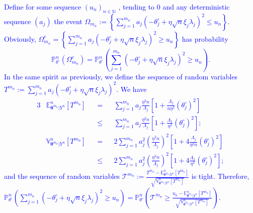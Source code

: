 \textcolor{blue}{
Define for some sequence $(u_{n})_{n \in \mathds{N}}$ , tending to $0$ and any deterministic sequence $(a_{j})$ the event $\Omega_{m_{n}} := \left\{\sum\limits_{j=1}^{m_{n}}a_{j}\left(- \theta^{\circ}_{j} + \eta \sqrt{n} \xi_{j} \lambda_{j}\right)^{2} \leq u_{n}\right\}.$\\
Obviously, $\Omega_{m_{n}}^{c} = \left\{\sum\limits_{j=1}^{m_{n}} a_{j} \left( - \theta^{\circ}_{j} + \eta \sqrt{n} \xi_{j} \lambda_{j}\right)^{2} \geq u_{n}\right\}$ has probability
\[\mathds{P}_{\theta^{\circ}}^{n}\left(\Omega_{m_{n}}^{c}\right) = \mathds{P}_{\theta^{\circ}}^{n}\left(\sum\limits_{j=1}^{m_{n}}\left(- \theta^{\circ}_{j} + \eta \sqrt{n} \xi_{j} \lambda_{j}\right)^{2} \geq u_{n}\right).\]
In the same spirit as previously, we define the sequence of random variables $T^{m_{n}} := \sum\limits_{j=1}^{m_{n}}a_{j}\left(- \theta^{\circ}_{j} + \eta \sqrt{n} \xi_{j} \lambda_{j}\right)^{2}.$
We have
\begin{alignat*}{3}
&\mathds{E}_{\boldsymbol{\theta}^{m_{n}} \vert Y^{n}}^{n}\left[T^{m_{n}}\right] &&=&& \sum\limits_{j = 1}^{m_{n}} a_{j} \frac{\eta^{2} n}{\Lambda_{j}} \left[1 + \frac{\Lambda_{j}}{n \eta^{2}} \left(\theta^{\circ}_{j} \right)^{2}\right]\\
& &&\leq&& \sum\limits_{j = 1}^{m_{n}} a_{j} \frac{\eta^{2} n}{\Lambda_{j}} \left[1 + \frac{\Lambda_{1}}{\eta^{2}} \left(\theta^{\circ}_{j}\right)^{2}\right];\\
&\mathds{V}_{\boldsymbol{\theta}^{m_{n}} \vert Y^{n}}^{n}\left[T^{m_{n}}\right] &&=&& 2 \sum\limits_{j = 1}^{m_{n}} a_{j}^{2} \left(\frac{\eta^{2} n}{\Lambda_{j}}\right)^{2} \left[1 + 4 \frac{\Lambda_{j}}{\eta^{2} n} \left(\theta^{\circ}_{j}\right)^{2}\right]\\
& &&\leq&& 2 \sum\limits_{j = 1}^{m_{n}} a_{j}^{2} \left(\frac{\eta^{2} n}{\Lambda_{j}}\right)^{2} \left[1 + 4 \frac{\Lambda_{1}}{\eta^{2}} \left(\theta^{\circ}_{j}\right)^{2}\right];
\end{alignat*}
and the sequence of random variables $\mathcal{T}^{m_{n}} := \frac{T^{m_{n}} - \mathds{E}_{\boldsymbol{\theta}^{m_{n}} \vert Y^{n}}^{n}\left[T^{m_{n}}\right]}{\sqrt{\mathds{V}_{\boldsymbol{\theta}^{m_{n}} \vert Y^{n}}^{n}\left[T^{m_{n}}\right]}}$ is tight.
Therefore, $\mathds{P}_{\theta^{\circ}}^{n}\left(\sum\limits_{j=1}^{m_{n}}\left(- \theta^{\circ}_{j} + \eta \sqrt{n} \xi_{j} \lambda_{j}\right)^{2} \geq u_{n}\right) = \mathds{P}_{\theta^{\circ}}^{n}\left(\mathcal{T}^{m_{n}} \geq \frac{u_{n} - \mathds{E}_{\boldsymbol{\theta}^{m_{n}} \vert Y^{n}}^{n}\left[T^{m_{n}}\right]}{\sqrt{\mathds{V}_{\boldsymbol{\theta}^{m_{n}} \vert Y^{n}}^{n}\left[T^{m_{n}}\right]}}\right)$.
}
